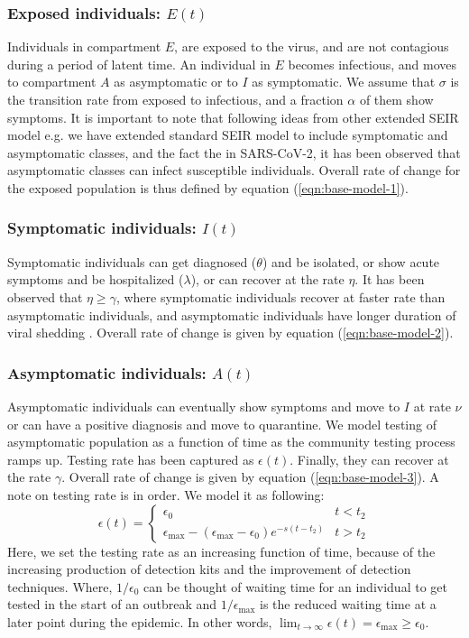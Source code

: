 \documentclass[10pt]{wlscirep}
\begin{document}
\subsubsection*{Exposed individuals: $E(t)$}
Individuals in compartment $E$, are exposed to the virus, and are not contagious during a period of latent time. An individual in $E$ becomes infectious, and moves to compartment $A$ as asymptomatic or to $I$ as symptomatic. We assume that $\sigma$ is the transition rate from exposed to infectious, and a fraction $\alpha$ of them show symptoms.  It is important to note that following ideas from other extended SEIR model e.g. \cite{Anggriani_2013, EIKENBERRY2020293, ANGGRIANI2022113,PANS2019716118,Layton22} we have extended standard SEIR model to include symptomatic and asymptomatic classes, and the fact the in SARS-CoV-2, it has been observed that asymptomatic classes can infect susceptible individuals\cite{PANS2019716118}. Overall rate of change for the exposed population is thus defined by equation (\ref{eqn:base-model-1}).

\subsubsection*{Symptomatic individuals: $I(t)$}
Symptomatic individuals can get diagnosed ($\theta$) and be isolated, or show acute symptoms and be hospitalized ($\lambda$), or can recover at the rate $\eta$. It has been observed that $\eta \geq \gamma$, where symptomatic individuals recover at faster rate than asymptomatic individuals, and asymptomatic individuals have longer duration of viral shedding \cite{Long2020}. Overall rate of change is given by equation (\ref{eqn:base-model-2}).

\subsubsection*{Asymptomatic individuals: $A(t)$}
Asymptomatic individuals can eventually show symptoms and move to $I$ at rate $\nu$ or can have a positive diagnosis and move to quarantine. We model testing of asymptomatic population as a function of time as the community testing process ramps up. Testing rate has been captured as $\epsilon(t)$. Finally, they can recover at the rate $\gamma$. Overall rate of change is given by equation (\ref{eqn:base-model-3}). A note on testing rate is in order. We model it as following:
%
%
\begin{equation}
\epsilon(t) = 
\begin{cases}
\epsilon_0 & t < t_2 \\
\epsilon_{\max} - (\epsilon_{\max} - \epsilon_0) e^{-s \left( t-t_2\right) } & t > t_2
\end{cases}
\label{eqn:base-model-13}
\end{equation}
%
%
Here, we set the testing rate as an increasing function of time, because of the increasing production of detection kits and the improvement of detection techniques. Where, $1/ \epsilon_0$ can be thought of waiting time for an individual to get tested in the start of an outbreak and $1/\epsilon_{\max}$ is the reduced waiting time at a later point during the epidemic. In other words, $\lim_{t \rightarrow \infty}  \epsilon(t) =  \epsilon_{\max} \geq \epsilon_0$.
%
%
\end{document}
